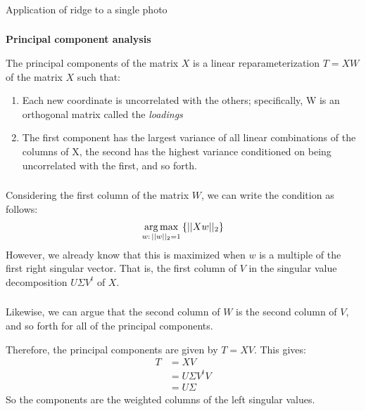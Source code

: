 \begin{frame}[fragile] \frametitle{}

{\color{yaleblue}\fontsize{16pt}{20pt}\selectfont Application of ridge to a single photo}

\end{frame}

\begin{frame}[fragile] \frametitle{}

\textbf{Principal component analysis}

The principal components of the matrix $X$ is a linear
reparameterization $T=XW$ of the matrix $X$ such that: \pause
\begin{enumerate}
\item Each new coordinate is uncorrelated with the others; specifically,
W is an orthogonal matrix called the \textit{loadings} \pause
\item The first component has the largest variance of all
linear combinations of the columns of X, the second has the
highest variance conditioned on being uncorrelated with the
first, and so forth.
\end{enumerate}

\end{frame}

\begin{frame}[fragile] \frametitle{}

Considering the first column of the matrix $W$, we can write the
condition as follows:
\begin{align*}
\mathop{\mathrm{arg\,max}}_{w:\, ||w||_2 = 1} \left\{ ||Xw||_2 \right\}
\end{align*}
\pause However, we already know that this is maximized when
$w$ is a multiple of the first right singular vector. That is,
the first column of $V$ in the singular value decomposition $U\Sigma V^t$
of $X$.

\end{frame}

\begin{frame}[fragile] \frametitle{}

Likewise, we can argue that the second column of $W$ is the second
column of $V$, and so forth for all of the principal components.

\pause Therefore, the principal components are given by $T = XV$.
This gives:
\begin{align*}
T &= XV \\
&= U\Sigma V^t V \\
&= U \Sigma
\end{align*}
So the components are the weighted columns of the left singular values.

\end{frame}

